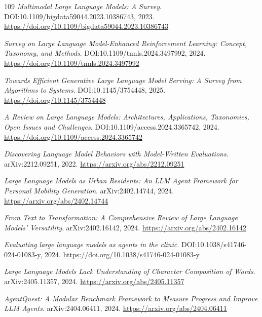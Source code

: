 \documentclass[11pt,a4paper]{article}
\begin{document}
\begin{thebibliography}{109}
\newblock \emph{Multimodal Large Language Models: A Survey}.
\newblock DOI:10.1109/bigdata59044.2023.10386743, 2023.
\newblock \url{https://doi.org/10.1109/bigdata59044.2023.10386743}

\newblock \emph{Survey on Large Language Model-Enhanced Reinforcement Learning: Concept, Taxonomy, and Methods}.
\newblock DOI:10.1109/tnnls.2024.3497992, 2024.
\newblock \url{https://doi.org/10.1109/tnnls.2024.3497992}

\newblock \emph{Towards Efficient Generative Large Language Model Serving: A Survey from Algorithms to Systems}.
\newblock DOI:10.1145/3754448, 2025.
\newblock \url{https://doi.org/10.1145/3754448}

\newblock \emph{A Review on Large Language Models: Architectures, Applications, Taxonomies, Open Issues and Challenges}.
\newblock DOI:10.1109/access.2024.3365742, 2024.
\newblock \url{https://doi.org/10.1109/access.2024.3365742}

\newblock \emph{Discovering Language Model Behaviors with Model-Written Evaluations}.
\newblock arXiv:2212.09251, 2022.
\newblock \url{https://arxiv.org/abs/2212.09251}

\newblock \emph{Large Language Models as Urban Residents: An LLM Agent Framework for Personal Mobility Generation}.
\newblock arXiv:2402.14744, 2024.
\newblock \url{https://arxiv.org/abs/2402.14744}

\newblock \emph{From Text to Transformation: A Comprehensive Review of Large Language Models' Versatility}.
\newblock arXiv:2402.16142, 2024.
\newblock \url{https://arxiv.org/abs/2402.16142}

\newblock \emph{Evaluating large language models as agents in the clinic}.
\newblock DOI:10.1038/s41746-024-01083-y, 2024.
\newblock \url{https://doi.org/10.1038/s41746-024-01083-y}

\newblock \emph{Large Language Models Lack Understanding of Character Composition of Words}.
\newblock arXiv:2405.11357, 2024.
\newblock \url{https://arxiv.org/abs/2405.11357}

\newblock \emph{AgentQuest: A Modular Benchmark Framework to Measure Progress and Improve LLM Agents}.
\newblock arXiv:2404.06411, 2024.
\newblock \url{https://arxiv.org/abs/2404.06411}


\end{thebibliography}
\end{document}
